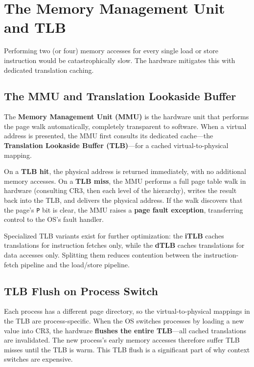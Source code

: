 \documentclass[11pt]{article}
\begin{document}
\section{The Memory Management Unit and TLB}

Performing two (or four) memory accesses for every single load or store instruction would be catastrophically slow. The hardware mitigates this with dedicated translation caching.

\subsection{The MMU and Translation Lookaside Buffer}

The \textbf{Memory Management Unit (MMU)} is the hardware unit that performs the page walk automatically, completely transparent to software. When a virtual address is presented, the MMU first consults its dedicated cache---the \textbf{Translation Lookaside Buffer (TLB)}---for a cached virtual-to-physical mapping.

On a \textbf{TLB hit}, the physical address is returned immediately, with no additional memory accesses. On a \textbf{TLB miss}, the MMU performs a full page table walk in hardware (consulting CR3, then each level of the hierarchy), writes the result back into the TLB, and delivers the physical address. If the walk discovers that the page's \texttt{P} bit is clear, the MMU raises a \textbf{page fault exception}, transferring control to the OS's fault handler.

Specialized TLB variants exist for further optimization: the \textbf{iTLB} caches translations for instruction fetches only, while the \textbf{dTLB} caches translations for data accesses only. Splitting them reduces contention between the instruction-fetch pipeline and the load/store pipeline.

\subsection{TLB Flush on Process Switch}

Each process has a different page directory, so the virtual-to-physical mappings in the TLB are process-specific. When the OS switches processes by loading a new value into CR3, the hardware \textbf{flushes the entire TLB}---all cached translations are invalidated. The new process's early memory accesses therefore suffer TLB misses until the TLB is warm. This TLB flush is a significant part of why context switches are expensive.
\end{document}
